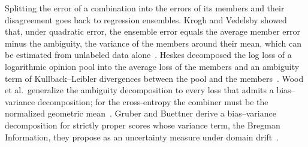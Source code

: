 Splitting the error of a combination into the errors of its members
and their disagreement goes back to regression ensembles. Krogh and
Vedelsby showed that, under quadratic error, the ensemble error equals
the average member error minus the ambiguity, the variance of the
members around their mean, which can be estimated from unlabeled data
alone~\cite{krogh1994neural}.
Heskes decomposed the log loss of a logarithmic opinion pool into the
average loss of the members and an ambiguity term of
Kullback--Leibler divergences between the pool and the
members~\cite{heskes1997selecting}.
Wood et al.\ generalize the ambiguity decomposition to every loss that
admits a bias--variance decomposition; for the cross-entropy the
combiner must be the normalized geometric mean~\cite{wood2023unified}.
Gruber and Buettner derive a
bias--variance decomposition for strictly proper scores whose variance
term, the Bregman Information, they propose as an uncertainty measure
under domain drift~\cite{gruber2022uncertainty}.

